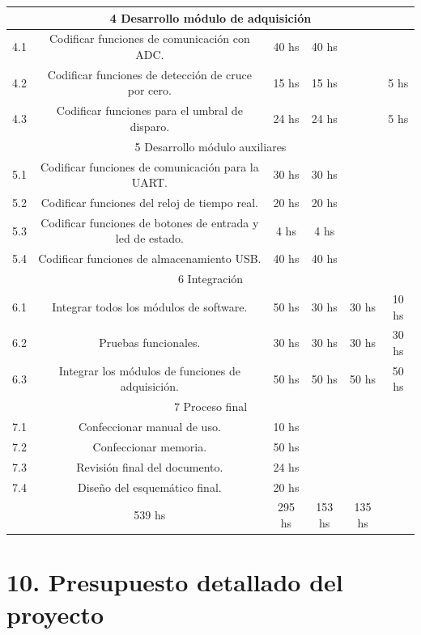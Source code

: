 \documentclass[11pt]{charter}
\begin{document}
\begin{table}[H]
{\begin{tabular}{|c|c|c|c|c|c|}
\multicolumn{6}{|c|}{\cellcolor[HTML]{FF3333}4 Desarrollo módulo de adquisición} \\ \hline
4.1 & Codificar funciones de comunicación con ADC. & 40 hs & 40 hs &  &    \\ \hline
4.2 & Codificar funciones de detección de cruce por cero. & 15 hs & 15 hs &  & 5 hs   \\ \hline
4.3 & Codificar funciones para el umbral de disparo. & 24 hs & 24 hs &  &  5 hs  \\ \hline
\multicolumn{6}{|c|}{\cellcolor[HTML]{FFFF00}5 Desarrollo módulo auxiliares} \\ \hline
5.1 & Codificar funciones de comunicación para la UART. & 30 hs & 30 hs &  &    \\ \hline
5.2 & Codificar funciones del reloj de tiempo real. & 20 hs & 20 hs &  &    \\ \hline
5.3 & Codificar funciones de botones de entrada y led de estado. & 4 hs & 4 hs &  &    \\ \hline
5.4 & Codificar funciones de almacenamiento USB. & 40 hs & 40 hs &  &    \\ \hline
\multicolumn{6}{|c|}{\cellcolor[HTML]{66CC00}6 Integración} \\ \hline
6.1 & Integrar todos los módulos de software. & 50 hs & 30 hs & 30 hs & 10 hs   \\ \hline
6.2 & Pruebas funcionales. & 30 hs & 30 hs & 30 hs & 30 hs   \\ \hline
6.3 & Integrar los módulos de funciones de adquisición. & 50 hs & 50 hs & 50 hs & 50 hs  \\ \hline
\multicolumn{6}{|c|}{\cellcolor[HTML]{EA6B66}7 Proceso final} \\ \hline
7.1 & Confeccionar manual de uso. & 10 hs &  &  &    \\ \hline
7.2 & Confeccionar memoria. & 50 hs &  &  &    \\ \hline
7.3 & Revisión final del documento. & 24 hs &  &  &    \\ \hline
7.4 & Diseño del esquemático final. & 20 hs &  &  &    \\ \hline  
\rowcolor[HTML]{C0C0C0} 
\multicolumn{2}{|c|}{\cellcolor[HTML]{C0C0C0} Totales} & 539 hs & 295 hs & 153 hs & 135 hs    \\ \hline
\end{tabular}%
}
\end{table}

\section{10. Presupuesto detallado del proyecto}
\label{sec:presupuesto}
\end{document}
